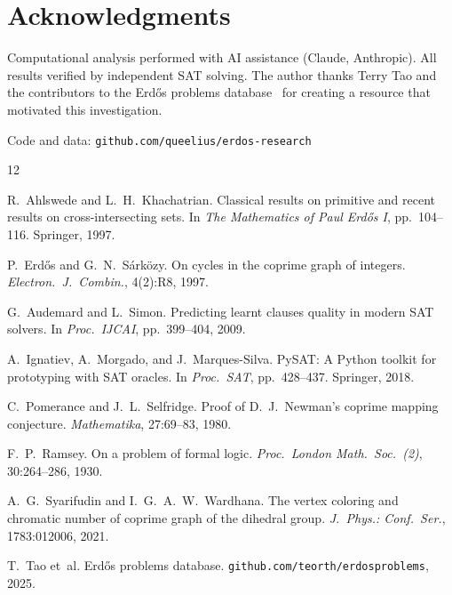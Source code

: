 \documentclass[11pt]{article}
\theoremstyle{plain}
\theoremstyle{definition}
\begin{document}
\section*{Acknowledgments}

Computational analysis performed with AI assistance (Claude, Anthropic).
All results verified by independent SAT solving. The author thanks
Terry Tao and the contributors to the Erd\H{o}s problems
database~\cite{tao2025erdos} for creating a resource that motivated
this investigation.

\smallskip\noindent
Code and data: \texttt{github.com/queelius/erdos-research}

\begin{thebibliography}{12}

R.~Ahlswede and L.~H.~Khachatrian.
Classical results on primitive and recent results on cross-intersecting
sets.
In \emph{The Mathematics of Paul Erd\H{o}s I}, pp.~104--116.
Springer, 1997.

P.~Erd\H{o}s and G.~N.~S\'ark\"ozy.
On cycles in the coprime graph of integers.
\emph{Electron.\ J.\ Combin.}, 4(2):R8, 1997.

G.~Audemard and L.~Simon.
Predicting learnt clauses quality in modern {SAT} solvers.
In \emph{Proc.\ IJCAI}, pp.~399--404, 2009.

A.~Ignatiev, A.~Morgado, and J.~Marques-Silva.
{PySAT}: A {P}ython toolkit for prototyping with {SAT} oracles.
In \emph{Proc.\ SAT}, pp.~428--437. Springer, 2018.

C.~Pomerance and J.~L.~Selfridge.
Proof of {D.~J.~Newman's} coprime mapping conjecture.
\emph{Mathematika}, 27:69--83, 1980.

F.~P.~Ramsey.
On a problem of formal logic.
\emph{Proc.\ London Math.\ Soc.\ (2)}, 30:264--286, 1930.

A.~G.~Syarifudin and I.~G.~A.~W.~Wardhana.
The vertex coloring and chromatic number of coprime graph of the
dihedral group.
\emph{J.\ Phys.: Conf.\ Ser.}, 1783:012006, 2021.

T.~Tao et~al.
Erd\H{o}s problems database.
\texttt{github.com/teorth/erdosproblems}, 2025.

\end{thebibliography}
\end{document}
